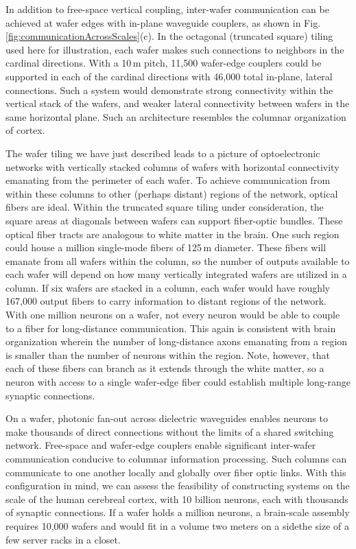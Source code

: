 \documentclass[twocolumn]{article}
\begin{document}
In addition to free-space vertical coupling, inter-wafer communication can be achieved at wafer edges with in-plane waveguide couplers, as shown in Fig.\,\ref{fig:communicationAcrossScales}(c). In the octagonal (truncated square) tiling used here for illustration, each wafer makes such connections to neighbors in the cardinal directions. With a 10\,\textmu m pitch, 11,500 wafer-edge couplers could be supported in each of the cardinal directions with 46,000 total in-plane, lateral connections. Such a system would demonstrate strong connectivity within the vertical stack of the wafers, and weaker lateral connectivity between wafers in the same horizontal plane. Such an architecture resembles the columnar organization of cortex.

The wafer tiling we have just described leads to a picture of optoelectronic networks with vertically stacked columns of wafers with horizontal connectivity emanating from the perimeter of each wafer. To achieve communication from within these columns to other (perhaps distant) regions of the network, optical fibers are ideal. Within the truncated square tiling under consideration, the square areas at diagonals between wafers can support fiber-optic bundles. These optical fiber tracts are analogous to white matter in the brain. One such region could house a million single-mode fibers of 125\,\textmu m diameter. These fibers will emanate from all wafers within the column, so the number of outputs available to each wafer will depend on how many vertically integrated wafers are utilized in a column. If six wafers are stacked in a column, each wafer would have roughly 167,000 output fibers to carry information to distant regions of the network. With one million neurons on a wafer, not every neuron would be able to couple to a fiber for long-distance communication. This again is consistent with brain organization wherein the number of long-distance axons emanating from a region is smaller than the number of neurons within the region. Note, however, that each of these fibers can branch as it extends through the white matter, so a neuron with access to a single wafer-edge fiber could establish multiple long-range synaptic connections. 

On a wafer, photonic fan-out across dielectric waveguides enables neurons to make thousands of direct connections without the limits of a shared switching network. Free-space and wafer-edge couplers enable significant inter-wafer communication conducive to columnar information processing. Such columns can communicate to one another locally and globally over fiber optic links. With this configuration in mind, we can assess the feasibility of constructing systems on the scale of the human cerebreal cortex, with 10 billion neurons, each with thousands of synaptic connections. If a wafer holds a million neurons, a brain-scale assembly requires 10,000 wafers and would fit in a volume two meters on a side\textemdash the size of a few server racks in a closet. 
\end{document}
